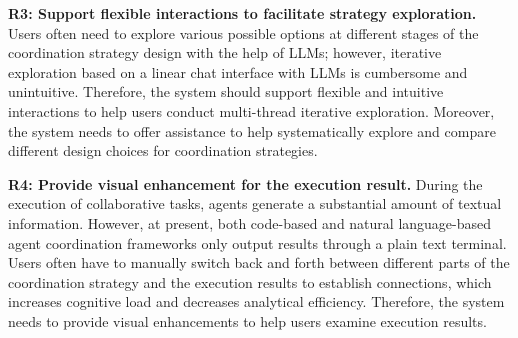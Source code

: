 \textbf{R3: Support flexible interactions to facilitate strategy exploration.} Users often need to explore various possible options at different stages of the coordination strategy design with the help of LLMs; however, iterative exploration based on a linear chat interface with LLMs is cumbersome and unintuitive. Therefore, the system should support flexible and intuitive interactions to help users conduct multi-thread iterative exploration. Moreover, the system needs to offer assistance to help systematically explore and compare different design choices for coordination strategies.

\textbf{R4: Provide visual enhancement for the execution result.} During the execution of collaborative tasks, agents generate a substantial amount of textual information. However, at present, both code-based and natural language-based agent coordination frameworks only output results through a plain text terminal. Users often have to manually switch back and forth between different parts of the coordination strategy and the execution results to establish connections, which increases cognitive load and decreases analytical efficiency. Therefore, the system needs to provide visual enhancements to help users examine execution results. 
